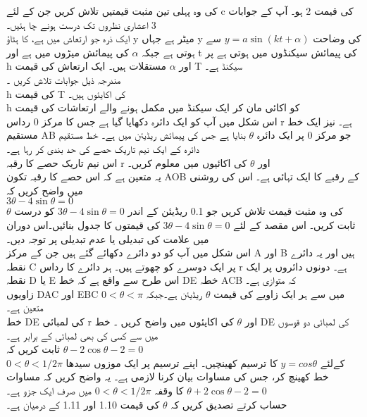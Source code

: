 کی وہ پہلی تین مثبت قیمتیں تلاش کریں جن کے لئے 
c
 کی قیمت 
\(2\)
 ہو۔
آپ کے جوابات 
\(3\)
 اعشاری نظروں تک درست ہونے چا ہئیں۔\\
ایک ذرہ جو ارتعاش میں ہے، کا ہٹاؤ 
y
میٹر ہے جہاں 
y
کی وضاحت 
\(y=a\sin({kt+\alpha})\)
سے ہوتی ہے جبکہ  
\(\alpha\)
کی پیمائش میڑوں میں ہے اور 
t
کی پیمائش سیکنڈوں میں ہوتی ہے پر 
h
اور 
\(\alpha\)
مستقلات ہیں۔ ایک ارتعاش کی قیمت 
T
سیکنڈ ہے۔\\
مندرجہ ذیل جوابات تلاش کریں ۔\\
h
 کی قیمت 
T
کی اکایئوں ہیں۔\\
h
 کو اکائی مان کر ایک سیکنڈ میں
مکمل ہونے والے ارتعاشات کی قیمت\\
اس شکل میں آپ کو ایک دائرہ دکھایا گیا ہے جس کا مرکز
0
رداس
r
ہے۔
نیز ایک خط مستقیم
AB
جو مرکز
0
پر ایک دائرہ
\(\theta\)
بنایا ہے جس کی پیمائش ریڈیئن میں ہے۔ خط مستقیم دائرہ کے ایک نیم تاریک حصے کی حد بندی کر رہا ہے۔\\
اس نیم تاریک حصے کا رقبہ
r
اور
\(\theta\)
کی اکائیوں میں معلوم کریں۔\\
یہ متعین ہے کہ اس حصے کا رقبہ تکون
AOB
کے رقبے کا ایک تہائی ہے۔ اس کی روشنی میں واضح کریں کہ\\
\(3\theta-4\sin{\theta}=0\)\\
\(\theta\)
کی وہ مثبت قیمت تلاش کریں جو
0.1
ریڈیئن کے اندر
\(3\theta-4\sin{\theta}=0\)
کو درست ثابت کریں۔ اس مقصد کے لئے 
\(3\theta-4\sin{\theta}=0\)
کی قیمتوں کا جدول بنائیں۔اس دوران میں علامت کی تبدیلی یا عدم تبدیلی پر توجہ دیں۔ \\
اس شکل میں آپ کو دو دائرے دکھائے گئے ہیں جن کے مرکز
A
اور
B
ہیں اور یہ دائرے نقطہ 
C
پر ایک دوسرے کو چھوتے ہیں۔ ہر دائرے کا رداس
r
ہے۔ دونوں دائروں پر ایک نقطہ
D
یا
E
اس طرح سے واقع ہے کہ خط
DE
خطہ
ACB
کہ متوازی ہے۔\\
زاویوں
DAC
اور
EBC
میں سے ہر ایک زاویے کی قیمت
\(\theta\)
ریڈیئن ہے۔جبکہ
\(0<\theta<\pi\)
متعین ہے۔\\
خط
DE
کی لمبائی
r
اور
\(\theta\)
کی اکایئوں میں واضح کریں ۔
خط
DE
کی لمبائی دو قوسوں میں سے کسی کی بھی لمبائی کے برابر ہے۔\\
ثابت کریں کہ
\(\theta-2\cos{\theta}-2=0\)\\
\(0<\theta<1/2\pi\)
کےلئے
\(y=cos\theta\)
کا ترسیم کھینچیں۔ اپنے ترسیم پر ایک موزوں سیدھا خط کھینچ کر، جس کی مساوات بیان کرنا لازمی ہے۔
یہ واضح کریں کہ مساوات
\(\theta+2\cos{\theta}-2=0\)
کا وقفہ
\(0<\theta<1/2\pi\)
میں صرف ایک جزو ہے۔\\
حساب کرتے تصدیق کریں کہ
\(\theta\)
کی قیمت 
1.10
اور
1.11
کے درمیان ہے۔\\
